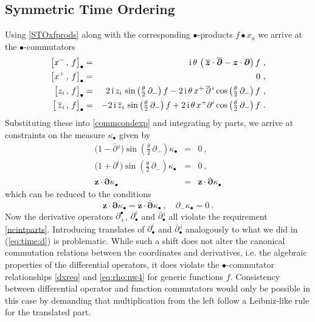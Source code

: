 \documentclass[11pt,a4paper]{article}
\newcommand{\cb}[2]{\bigl[#1\,,\,#2\bigr]}                 %
\def\nn{\nonumber}
\def\d{\partial}
\def\bfd{{\mbf\partial}}
\def\bfz{{\mbf z}}
\def\od{\overline{\partial}}
\def\oz{\overline{z}}
\def\obfd{\overline{\mbf\partial}}
\def\obfz{\overline{\mbf z}}
\newcommand{\1}{\mathbb{1}}
\newcommand{\mbf}[1]{{\boldsymbol {#1} }}
\def\ii{{\,{\rm i}\,}}
\def\nn{\nonumber}
\def\d{\partial}
\begin{document}
\subsection{Symmetric Time Ordering\label{STOint}}

Using \eqref{STOxfprods} along with the corresponding
$\bullet$-products $f\bullet x_a$ we arrive at the
$\bullet$-commutators
\begin{eqnarray}
\nn  \cb{x^-}{f}_\bullet&=&\ii\theta\,\left(\,
\obfz\cdot\obfd -\bfz\cdot\bfd\right)f \ , \\ \nn
  \cb{x^+}{f}_\bullet&=&0 \ , \\ \nn
  \cb{z_i}{f}_\bullet&=&2\ii
  z_i\,\sin\left(\mbox{$\frac\theta2$}\,\partial_-
\right)f-2\ii\theta\,x^+\,\od{}^{\,i}
\cos\left(\mbox{$\frac\theta2$}\,\partial_-\right)f \ , \\
  \cb{\,\oz_i}{f}_\bullet&=&-2\ii\oz_i\,\sin\left(\mbox{$\frac\theta2$}
\,\partial_-\right)f+2\ii\theta\,x^+\d^i\cos
\left(\mbox{$\frac\theta2$}\,\partial_-\right)f \ .
  \label{eq:symtime:comm}\end{eqnarray}
Substituting these into \eqref{commcondexp} and integrating by parts,
we arrive at constraints on the measure $\kappa_\bullet$ given by
\begin{eqnarray}
 \nn  \bigl(1-\od{}^{\,i}\bigr)\sin\left(\mbox{$\frac\theta2$}\,
\partial_-\right)\kappa_\bullet&=&0 \ , \\ \nn
  \bigl(1+\d^i\bigr)\sin\left(\mbox{$\frac\theta2$}\,
\partial_-\right)\kappa_\bullet&=&0 \ , \\
  \bfz\cdot\bfd\kappa_\bullet&=&\obfz\cdot\obfd\kappa_\bullet
 \label{eq:symtime:mu:all}\end{eqnarray}
which can be reduced to the conditions
\begin{equation}
  \label{eq:symtime:mu:rest}
  \bfz\cdot\bfd\kappa_\bullet=\obfz\cdot\obfd\kappa_\bullet \ ,
  \quad \d_-\kappa_\bullet=0 \ .
\end{equation}
Now the derivative operators $\d_+^\bullet$, $\d^i_\bullet$ and
$\od{}^{\,i}_\bullet$ all violate the requirement
\eqref{ncintparts}. Introducing translates of $\d^i_\bullet$ and
$\od{}^{\,i}_\bullet$ analogously to what we did in (\ref{eq:time:d})
is problematic. While such a shift does not alter the canonical
commutation relations between the coordinates and derivatives,
i.e. the algebraic properties of the differential operators, it does
violate the $\bullet$-commutator relationships \eqref{dxreq} and
\eqref{eq:rho:nw4} for generic functions $f$. Consistency between
differential operator and function commutators would only be
possible in this case by demanding that multiplication from the left
follow a Leibniz-like rule for the translated part.
\end{document}
